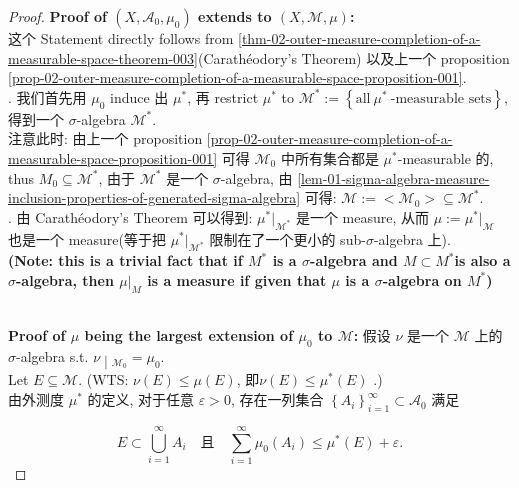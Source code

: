 \begin{proof}

\textbf{Proof of \((X,\mathcal{A}_{0},\mu_{0})\) extends to \((X,\mathcal{M},\mu)\):}\\
这个 Statement directly follows from \ref{thm-02-outer-measure-completion-of-a-measurable-space-theorem-003}(Carathéodory's Theorem) 以及上一个 proposition \ref{prop-02-outer-measure-completion-of-a-measurable-space-proposition-001}.\\
. 我们首先用 \(\mu_{0}\) induce 出 \(\mu^{\ast}\), 再 restrict \(\mu^{\ast}\) to \(\mathcal{M}^{\ast} := \left\{ {\text{all}\ \mu^{\ast}\ \text{-measurable sets}} \right\}\), 得到一个 \(\sigma\)-algebra \(\mathcal{M}^{\ast}\).\\
注意此时: 由上一个 proposition \ref{prop-02-outer-measure-completion-of-a-measurable-space-proposition-001} 可得 \(\mathcal{M}_{0}\) 中所有集合都是 \(\mu^{\ast}\)-measurable 的, thus \(M_{0} \subseteq \mathcal{M}^{\ast}\), 由于 \(\mathcal{M}^{\ast}\) 是一个 \(\sigma\)-algebra, 由 \ref{lem-01-sigma-algebra-measure-inclusion-properties-of-generated-sigma-algebra} 可得: \(\mathcal{M} := < \mathcal{M}_{0} > \subseteq \mathcal{M}^{\ast}\).\\
. 由 Carathéodory's Theorem 可以得到: \(\mu^{\ast}|_{\mathcal{M}^{\ast}}\) 是一个 measure, 从而 \(\mu := \mu^{\ast}|_{\mathcal{M}}\) 也是一个 measure(等于把 \(\mu^{\ast}|_{\mathcal{M}^{\ast}}\) 限制在了一个更小的 sub-\(\sigma\)-algebra 上).\\
\textbf{(Note: this is a trivial fact that if \(M^{\ast}\) is a \(\sigma\)-algebra and \(M \subset M^{\ast}\)is also a \(\sigma\)-algebra, then \(\mu|_{M}\) is a measure if given that \(\mu\) is a \(\sigma\)-algebra on \(M^{\ast}\))}\\
\strut \\
\textbf{Proof of \(\mu\) being the largest extension of \(\mu_{0}\) to \(\mathcal{M}\):} 假设 \(\nu\) 是一个 \(\mathcal{M}\) 上的 \(\sigma\)-algebra s.t. \(\left. \nu \middle| {}_{\mathcal{M}_{0}} = \mu_{0} \right.\).\\
Let \(E \subseteq \mathcal{M}\). (WTS: \(\nu(E) \leq \mu(E)\), 即\(\nu(E) \leq \mu^{\ast}(E)\) .)\\
由外测度 \(\mu^{\ast}\) 的定义, 对于任意 \(\varepsilon > 0\), 存在一列集合 \(\left\{ A_{i} \right\}_{i = 1}^{\infty} \subset \mathcal{A}_{0}\) 满足

\[E \subset \bigcup\limits_{i = 1}^{\infty}A_{i}\quad\text{且}\quad\sum\limits_{i = 1}^{\infty}\mu_{0}(A_{i}) \leq \mu^{\ast}(E) + \varepsilon.\]


\end{proof}
